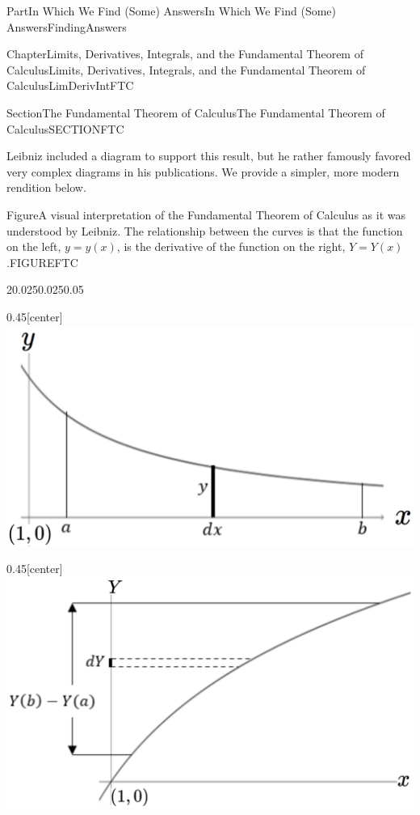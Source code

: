 \documentclass[oneside,10pt,]{book}
\numberwithin{equation}{part}
\begin{document}
\begin{partptx}{Part}{In Which We Find (Some) Answers}{}{In Which We Find (Some) Answers}{}{}{FindingAnswers}
\begin{chapterptx}{Chapter}{Limits, Derivatives, Integrals, and the Fundamental Theorem of Calculus}{}{Limits, Derivatives, Integrals, and the Fundamental Theorem of Calculus}{}{}{LimDerivIntFTC}
\begin{sectionptx}{Section}{The Fundamental Theorem of Calculus}{}{The Fundamental Theorem of Calculus}{}{}{SECTIONFTC}
\par
Leibniz included a diagram to support this result, but he rather famously favored very complex diagrams in his publications.  We provide a simpler, more modern rendition below.%
\begin{figureptx}{Figure}{A visual interpretation of the Fundamental Theorem of Calculus as it was understood by Leibniz.  The relationship between the curves is that the function on the  left, \(y=y(x)\), is the  derivative of the function  on the right, \(Y=Y(x)\).}{FIGUREFTC}{}%
\begin{sidebyside}{2}{0.025}{0.025}{0.05}%
\begin{sbspanel}{0.45}[center]%
\includegraphics[width=\linewidth]{external/images/FTC1.png}
\end{sbspanel}%
\begin{sbspanel}{0.45}[center]%
\includegraphics[width=\linewidth]{external/images/FTC2.png}
\end{sbspanel}%
\end{sidebyside}%
\tcblower
\end{figureptx}%

\end{sectionptx}
\end{chapterptx}
\end{partptx}
\end{document}
